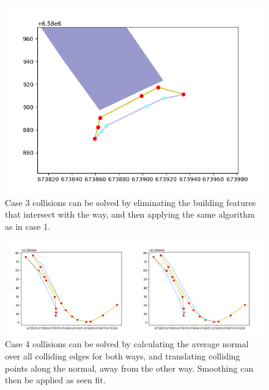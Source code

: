 \documentclass[a4paper]{article}
\begin{document}
\begin{figure}[H]
    \centering
    \includegraphics[width=\textwidth,height=0.5\textheight,keepaspectratio]{img_feature_overlap_fix_2}
    \caption{Case 3 collisions can be solved by eliminating the building features that intersect with the way, and then applying the same algorithm as in case 1.}
    \label{fig:space}
\end{figure}

\begin{figure}[H]
    \centering
    \includegraphics[width=\textwidth,height=0.5\textheight,keepaspectratio]{img_feature_overlap_fix_3}
    \caption{Case 4 collisions can be solved by calculating the average normal over all colliding edges for both ways, and translating colliding points along the normal, away from the other way. Smoothing can then be applied as seen fit.}
    \label{fig:space}
\end{figure}
\end{document}
